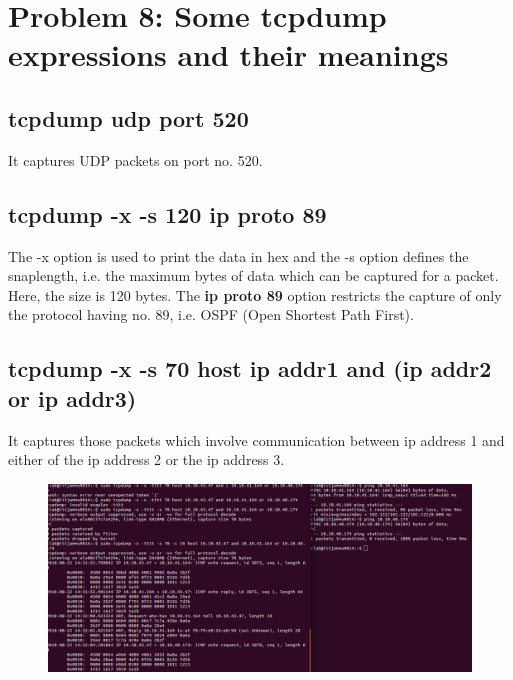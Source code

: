 \documentclass[]{report}
\begin{document}
\section{Problem 8: Some tcpdump expressions and their meanings}

\subsection{tcpdump udp port 520}
It captures UDP packets on port no. 520. 

\subsection{tcpdump -x -s 120 ip proto 89}
The -x option is used to print the data in hex and the -s option defines the snaplength, i.e. the maximum bytes of data which can be captured for a packet. Here, the size is 120 bytes. The \textbf{ip proto 89} option restricts the capture of only the protocol having no. 89, i.e. OSPF (Open Shortest Path First). 

\subsection{tcpdump -x -s 70 host ip addr1 and (ip addr2 or ip addr3)}
It captures those packets which involve communication between ip address 1 and either of the ip address 2 or the ip address 3.
\begin{figure}[H]
	\vspace{0pt}
	\includegraphics[width=600pt, keepaspectratio, center]{Snapshots/exe8/q8_3.png}
\end{figure} 
\end{document}
